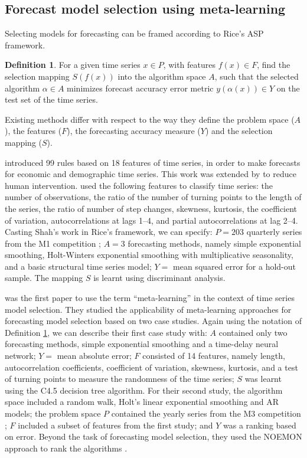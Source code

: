 \documentclass[11pt,a4paper,]{article}
\theoremstyle{definition}
\newtheorem{definition}{Definition}[section]
\theoremstyle{definition}
\theoremstyle{definition}
\theoremstyle{remark}
\begin{document}
\subsection{Forecast model selection using
meta-learning}\label{forecast-model-selection-using-meta-learning}

Selecting models for forecasting can be framed according to Rice's ASP
framework.

\begin{definition}
\label{def2}
For a given time series $x \in P$, with features $f(x) \in F$, find the selection mapping $S(f(x))$ into the algorithm space $A$, such that the selected algorithm $\alpha \in A$ minimizes forecast accuracy error metric $y(\alpha(x)) \in Y$ on the test set of the time series.
\end{definition}

Existing methods differ with respect to the way they define the problem
space (\(A\)), the features (\(F\)), the forecasting accuracy measure
(\(Y\)) and the selection mapping (\(S\)).

\textcite{collopy1992rule} introduced 99 rules based on 18 features of
time series, in order to make forecasts for economic and demographic
time series. This work was extended by \textcite{armstrong2001s} to
reduce human intervention. \textcite{shah1997model} used the following
features to classify time series: the number of observations, the ratio
of the number of turning points to the length of the series, the ratio
of number of step changes, skewness, kurtosis, the coefficient of
variation, autocorrelations at lags 1--4, and partial autocorrelations
at lag 2--4. Casting Shah's work in Rice's framework, we can specify:
\(P=203\) quarterly series from the M1 competition
\autocite{makridakis1982accuracy}; \(A=3\) forecasting methods, namely
simple exponential smoothing, Holt-Winters exponential smoothing with
multiplicative seasonality, and a basic structural time series model;
\(Y=\) mean squared error for a hold-out sample. The mapping \(S\) is
learnt using discriminant analysis.

\textcite{prudencio2004meta} was the first paper to use the term
``meta-learning'' in the context of time series model selection. They
studied the applicability of meta-learning approaches for forecasting
model selection based on two case studies. Again using the notation of
Definition \ref{def2}, we can describe their first case study with:
\(A\) contained only two forecasting methods, simple exponential
smoothing and a time-delay neural network; \(Y=\) mean absolute error;
\(F\) consisted of 14 features, namely length, autocorrelation
coefficients, coefficient of variation, skewness, kurtosis, and a test
of turning points to measure the randomness of the time series; \(S\)
was learnt using the C4.5 decision tree algorithm. For their second
study, the algorithm space included a random walk, Holt's linear
exponential smoothing and AR models; the problem space \(P\) contained
the yearly series from the M3 competition \autocite{makridakis2000m3};
\(F\) included a subset of features from the first study; and \(Y\) was
a ranking based on error. Beyond the task of forecasting model
selection, they used the NOEMON approach to rank the algorithms
\autocite{kalousis1999noemon}.
\end{document}
